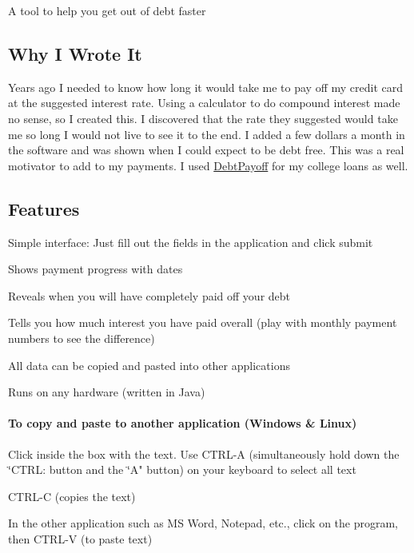 A tool to help you get out of debt faster

\subsection*{Why I Wrote It}

Years ago I needed to know how long it would take me to pay off my credit card at the suggested interest rate. Using a calculator to do compound interest made no sense, so I created this. I discovered that the rate they suggested would take me so long I would not live to see it to the end. I added a few dollars a month in the software and was shown when I could expect to be debt free. This was a real motivator to add to my payments. I used \mbox{\hyperlink{class_debt_payoff}{Debt\+Payoff}} for my college loans as well.

\subsection*{Features}


\begin{DoxyItemize}
\item Simple interface\+: Just fill out the fields in the application and click submit
\item Shows payment progress with dates
\item Reveals when you will have completely paid off your debt
\item Tells you how much interest you have paid overall (play with monthly payment numbers to see the difference)
\item All data can be copied and pasted into other applications
\item Runs on any hardware (written in Java)
\end{DoxyItemize}

 

\paragraph*{To copy and paste to another application (Windows \& Linux)}


\begin{DoxyItemize}
\item Click inside the box with the text. Use C\+T\+R\+L-\/A (simultaneously hold down the \char`\"{}\+C\+T\+R\+L\+: button and the \char`\"{}A" button) on your keyboard to select all text
\item C\+T\+R\+L-\/C (copies the text)
\item In the other application such as MS Word, Notepad, etc., click on the program, then C\+T\+R\+L-\/V (to paste text)
\end{DoxyItemize}

